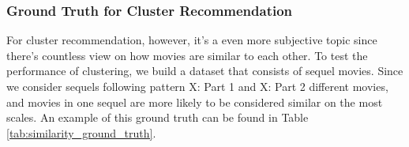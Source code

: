 \documentclass[journal]{IEEEtran}
\theoremstyle{mydefstyle}
\begin{document}


\subsubsection{Ground Truth for Cluster Recommendation} For cluster recommendation, however, it's a even more subjective topic since there's countless view on how movies are similar to each other. To test the performance of clustering, we build a dataset that consists of sequel movies. Since we consider sequels following pattern X: Part 1 and X: Part 2 different movies, and movies in one sequel are more likely to be considered similar on the most scales. An example of this ground truth can be found in Table \ref{tab:similarity_ground_truth}.
\end{document}
